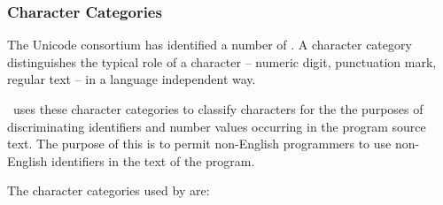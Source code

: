 \subsubsection{Character Categories}

The Unicode consortium has identified a number of . A character category distinguishes the typical role of a character -- numeric digit, punctuation mark, regular text -- in a language independent way.

\go\ uses these character categories to classify characters for the the purposes of discriminating identifiers and number values occurring in the program source text. The purpose of this is to permit non-English programmers to use non-English identifiers in the text of the program.

The character categories used by \go are:

